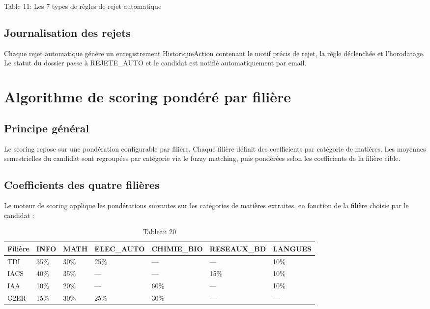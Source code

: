 Table 11:  Les 7 types de règles de rejet automatique

\subsection{Journalisation des rejets}

Chaque rejet automatique génère un enregistrement HistoriqueAction contenant le motif précis de rejet, la règle déclenchée et l'horodatage. Le statut du dossier passe à REJETE\_AUTO et le candidat est notifié automatiquement par email.

\section{Algorithme de scoring pondéré par filière}

\subsection{Principe général}

Le scoring repose sur une pondération configurable par filière. Chaque filière définit des coefficients par catégorie de matières. Les moyennes semestrielles du candidat sont regroupées par catégorie via le fuzzy matching, puis pondérées selon les coefficients de la filière cible.

\subsection{Coefficients des quatre filières}

Le moteur de scoring applique les pondérations suivantes sur les catégories de matières extraites, en fonction de la filière choisie par le candidat :

\begin{table}[htbp]
\centering
\begin{tabular}{|l|l|l|l|l|l|l|}
\hline
Filière & INFO & MATH & ELEC\_AUTO & CHIMIE\_BIO & RESEAUX\_BD & LANGUES \\
\hline
TDI & 35\% & 30\% & 25\% & — & — & 10\% \\
\hline
IACS & 40\% & 35\% & — & — & 15\% & 10\% \\
\hline
IAA & 10\% & 20\% & — & 60\% & — & 10\% \\
\hline
G2ER & 15\% & 30\% & 25\% & 30\% & — & — \\
\hline
\end{tabular}
\caption{Tableau 20}
\label{tab:table_20}
\end{table}

